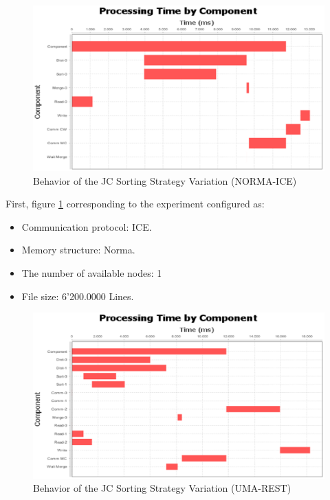 \begin{figure}[H]
	\centering
	\includegraphics[trim=0.5cm 17cm -5cm 1cm, scale=0.9]{fig/MSNormaIce162Behavior.eps}
	\caption{Behavior of the JC Sorting Strategy Variation (NORMA-ICE)}
	\label{fig:variationOriginalStrategyBehaviorIce}
\end{figure}

First, figure \ref{fig:variationOriginalStrategyBehaviorIce} corresponding to the experiment configured as: 
\begin{itemize}
	\item Communication protocol: ICE.
	\item  Memory structure: Norma.
	\item The number of available nodes: 1
	\item File size: 6'200.0000 Lines.
\end{itemize}

\begin{figure}[H]
	\centering
	\includegraphics[trim=0.5cm 17cm -5cm 1cm, scale=0.9]{fig/MSUmaRest282Behavior.eps}
	\caption{Behavior of the JC Sorting Strategy Variation (UMA-REST)}
	\label{fig:variationOriginalStrategyBehaviorRest}
\end{figure}

